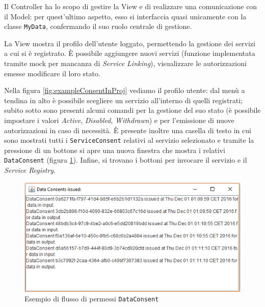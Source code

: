 Il Controller ha lo scopo di gestire la View e di realizzare una comunicazione con il Model: per quest’ultimo aspetto, esso si interfaccia quasi unicamente con la classe \texttt{MyData}, confermando il suo ruolo centrale di gestione.

La View mostra il profilo dell’utente loggato, permettendo la gestione dei servizi a cui si \`e registrato. \`E possibile aggiungere nuovi servizi (funzione implementata tramite mock per mancanza di \textit{Service Linking}), visualizzare le autorizzazioni emesse modificare il loro stato.

Nella figura \ref{fig:exampleConsentInProj} vediamo il profilo utente: dal men\`u a tendina in alto \`e possibile scegliere un servizio all’interno di quelli registrati; subito sotto sono presenti alcuni comandi per la gestione del suo stato (\`e possibile impostare i valori \textit{Active}, \textit{Disabled}, \textit{Withdrawn}) e per l’emissione di nuove autorizzazioni in caso di necessit\`a. \`E presente inoltre una casella di testo in cui sono mostrati tutti i \texttt{ServiceConsent} relativi al servizio selezionato e tramite la pressione di un bottone si apre una nuova finestra che mostra i relativi \texttt{DataConsent} (figura \ref{fig:DataConsentFrame}). Infine, si trovano i bottoni per invocare il servizio e il \textit{Service Registry}.
\begin{figure}
	\centering
	\includegraphics[width=0.5\linewidth]{pictures/DataConsentFrame.png}
	\caption{Esempio di flusso di permessi \texttt{DataConsent}}
	\label{fig:DataConsentFrame}
\end{figure}